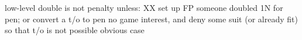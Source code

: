 low-level double is not penalty unless:
XX set up FP
someone doubled 1N for pen; or convert a t/o to pen
no game interest, and deny some suit (or already fit) so that t/o is not possible
obvious case    